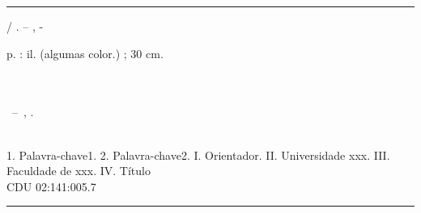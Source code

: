 

%    

\begin{fichacatalografica}

	\vspace*{\fill}					%
	\hrule							%
	\begin{center}					%
    	\begin{minipage}[c]{12.5cm}	%
    	
        	\imprimirautor
        	
        	\hspace{0.5cm} \imprimirtitulo  / \imprimirautor. --
        	\imprimirlocal, \imprimirdata-
        	
        	\hspace{0.5cm} \pageref{LastPage} p. : il. (algumas color.) ; 30 cm. \\
        	
        	\hspace{0.5cm} \imprimirorientadorRotulo~\imprimirorientador \\ \imprimirorientador \\
        	
        	\hspace{0.5cm}
        	\parbox[t]{\textwidth}{\imprimirtipotrabalho~--~\imprimirinstituicao,
        	\imprimirdata.}\\
        	
        	\hspace{0.5cm}
    		1. Palavra-chave1.
    		2. Palavra-chave2.
    		I. Orientador.
    		II. Universidade xxx.
    		III. Faculdade de xxx.
    		IV. Título \\ 			
        	
        	\hspace{8.75cm} CDU 02:141:005.7 \\
    	
    	\end{minipage}
	\end{center}
	\hrule

\end{fichacatalografica}
